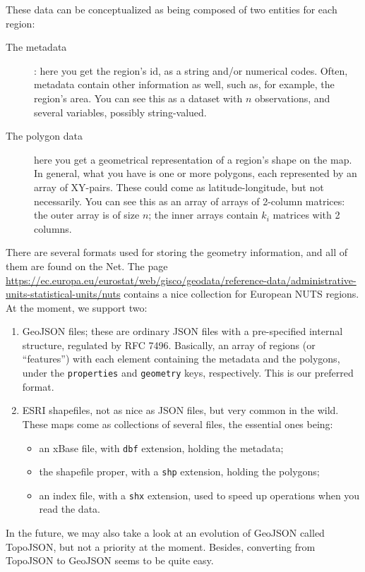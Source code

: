 \documentclass[a4paper]{article}
\begin{document}
These data can be conceptualized as being composed of two entities for
each region:
\begin{description}
\item[The metadata]: here you get the region's id, as a string and/or
  numerical codes. Often, metadata contain other information as well,
  such as, for example, the region's area. You can see this as a
  dataset with $n$ observations, and several variables, possibly
  string-valued.
\item[The polygon data] here you get a geometrical representation of a
  region's shape on the map. In general, what you have is one or more
  polygons, each represented by an array of XY-pairs. These could come
  as latitude-longitude, but not necessarily. You can see this as an
  array of arrays of 2-column matrices: the outer array is of size
  $n$; the inner arrays contain $k_i$ matrices with 2 columns.
\end{description}

There are several formats used for storing the geometry information,
and all of them are found on the Net. The page
\url{https://ec.europa.eu/eurostat/web/gisco/geodata/reference-data/administrative-units-statistical-units/nuts}
contains a nice collection for European NUTS regions. At the moment,
we support two:
\begin{enumerate}
\item GeoJSON files; these are ordinary JSON files with a
  pre-specified internal structure, regulated by RFC 7496. Basically,
  an array of regions (or ``features'') with each element containing
  the metadata and the polygons, under the \texttt{properties} and
  \texttt{geometry} keys, respectively.  This is our preferred format.
\item ESRI shapefiles, not as nice as JSON files, but very common in
  the wild. These maps come as collections of several files, the
  essential ones being:
  \begin{itemize}
  \item an xBase file, with \texttt{dbf} extension, holding the
    metadata;
  \item the shapefile proper, with a \texttt{shp} extension, holding the
    polygons;
  \item an index file, with a \texttt{shx} extension, used to speed up
    operations when you read the data.
  \end{itemize}
\end{enumerate}

In the future, we may also take a look at an evolution of GeoJSON
called TopoJSON, but not a priority at the moment. Besides, converting
from TopoJSON to GeoJSON seems to be quite easy.
\end{document}
